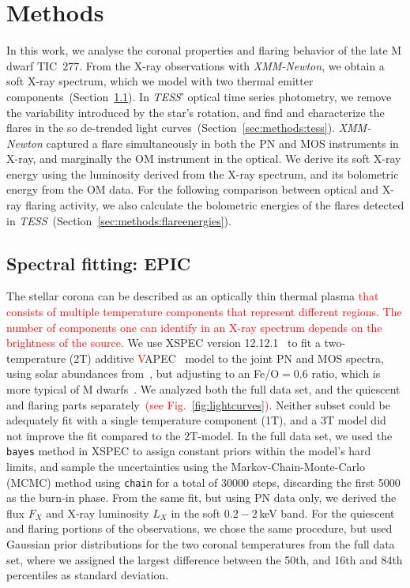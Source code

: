 \documentclass[twocolumn]{aastex631}
\begin{document}
\section{Methods}
\label{sec:methods}
In this work, we analyse the coronal properties and flaring behavior of the late M dwarf TIC~277. From the X-ray observations with \textit{XMM-Newton}, we obtain a soft X-ray spectrum, which we model with two thermal emitter components~(Section~\ref{sec:methods:epic}). In \textit{TESS}' optical time series photometry, we remove the variability introduced by the star's rotation, and find and characterize the flares in the so de-trended light curves~(Section~\ref{sec:methods:tess}). \textit{XMM-Newton} captured a flare simultaneously in both the PN and MOS instruments in X-ray, and marginally the OM instrument in the optical. We derive its soft X-ray energy using the luminosity derived from the X-ray spectrum, and its bolometric energy from the OM data. For the following comparison between optical and X-ray flaring activity, we also calculate the bolometric energies of the flares detected in \textit{TESS}~(Section~\ref{sec:methods:flareenergies}). 

\subsection{Spectral fitting: EPIC}
\label{sec:methods:epic}
The stellar corona can be described as an optically thin thermal plasma \textcolor{red}{that consists of multiple temperature components that represent different regions. The number of components one can identify in an X-ray spectrum depends on the brightness of the source.} We use XSPEC version 12.12.1~\citep{arnaud1996xspec} to fit a two-temperature (2T) additive \textcolor{red}{V}APEC~\citep{smith2001collisional,foster2012updated} model to the joint PN and MOS spectra, using solar abundances from~\citet{grevesse1998standard}, but adjusting to an Fe/O$=0.6$ ratio, which is more typical of M dwarfs~\citep{wood2018chandra}. We analyzed both the full data set, and the quiescent and flaring parts separately~\textcolor{red}{(see Fig.~\ref{fig:lightcurves})}. Neither subset could be adequately fit with a single temperature component (1T), and a 3T model did not improve the fit compared to the 2T-model. In the full data set, we used the \texttt{bayes} method in XSPEC to assign constant priors within the model's hard limits, and sample the uncertainties using the Markov-Chain-Monte-Carlo (MCMC) method using \texttt{chain} for a total of 30000 steps, discarding the first 5000 as the burn-in phase. From the same fit, but using PN data only, we derived the flux $F_X$ and X-ray luminosity $L_X$ in the soft $0.2-2\,$keV band. For the quiescent and flaring portions of the observations, we chose the same procedure, but used Gaussian prior distributions for the two coronal temperatures from the full data set, where we assigned the largest difference between the 50th, and 16th and 84th percentiles as standard deviation.
\end{document}
